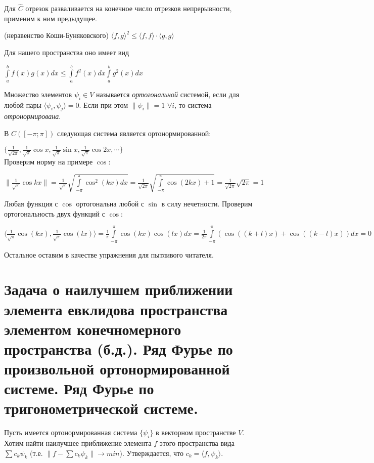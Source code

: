 \documentclass{article}
\begin{document}
	Для $\hat C$ отрезок разваливается на конечное число отрезков непрерывности, применим к ним предыдущее.
	
	\begin{theorem} (неравенство Коши-Буняковского) $\langle f, g \rangle^2 \le \langle f, f \rangle \cdot \langle g, g \rangle$ \end{theorem}
	
	Для нашего пространства оно имеет вид 
	
	$\int\limits_a^b f(x)g(x)dx \le \int\limits_a^b f^2(x)dx \int\limits_a^b g^2(x)dx$
	
	\begin{definition}
		Множество элементов  ${\psi_i} \in V$ называется \textit{ортогональной} системой, если для любой пары $\langle \psi_i, \psi_j\rangle=0$. Если при этом $\| \psi_i \|=1$ $\forall i$, то система \textit{отронормирована}.
	\end{definition}

	В $C([-\pi; \pi])$ следующая система является ортонормированной:
	
	$\{{\frac{1}{\sqrt{2\pi}}, \frac{1}{\sqrt{\pi}}\cos x, \frac{1}{\sqrt{\pi}}\sin x, \frac{1}{\sqrt{\pi}}\cos {2x}, \cdots}\}$\\
	
	Проверим норму на примере $\cos$:
	
	$\| \frac{1}{\sqrt{\pi}}\cos {kx}\|= \frac{1}{\sqrt{\pi}}
	 \sqrt{\int\limits_{-\pi}^{\pi} \cos^2 (kx) dx}=
	 \frac{1}{\sqrt{2\pi}} \sqrt{\int\limits_{-\pi}^{\pi} \cos(2kx) + 1}=\frac{1}{\sqrt{2\pi}} \sqrt{2\pi}=1$
	
	Любая функция с $\cos$ ортогональна любой с $\sin$ в силу нечетности. Проверим ортогональность двух функций с $\cos$:
	
	$\langle \frac{1}{\sqrt{\pi}} \cos(kx), \frac{1}{\sqrt{\pi}}\cos(lx) \rangle=\frac{1}{\pi}\int\limits_{-\pi}^{\pi}\cos(kx) \cos(lx) dx=\frac{1}{2\pi}\int\limits_{-\pi}^{\pi}(\cos((k+l)x)+\cos((k-l)x)) dx=0$
	
	Остальное оставим в качестве упражнения для пытливого читателя.
	
	\section{Задача о наилучшем приближении элемента евклидова пространства элементом конечномерного пространства (б.д.). Ряд Фурье по произвольной ортонормированной системе. Ряд Фурье по тригонометрической системе.}
	
	Пусть имеется ортонормированная система $\{{\psi_i}\}$ в векторном пространстве $V$. Хотим найти наилучшее приближение элемента $f$ этого пространства вида $\sum c_k \psi_k$ (т.е. $\|f-\sum c_k \psi_k\| \rightarrow min$). Утверждается, что $c_k=\langle f, \psi_k\rangle$.
	
\end{document}
